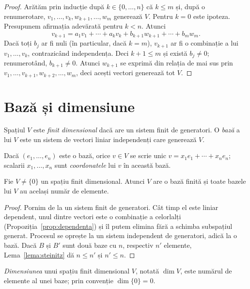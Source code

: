 \begin{proof}
Arătăm prin inducție după $k\in\{0,\dots,n\}$ că $k\le m$ și, după o renumerotare, $v_1,\dots,v_k,w_{k+1},\dots,w_m$ generează $V$. Pentru $k=0$ este ipoteza. Presupunem afirmația adevărată pentru $k<n$. Atunci
\[
v_{k+1}=a_1v_1+\cdots+a_kv_k+b_{k+1}w_{k+1}+\cdots+b_mw_m .
\]
Dacă toți $b_j$ ar fi nuli (în particular, dacă $k=m$), $v_{k+1}$ ar fi o combinație a lui $v_1,\dots,v_k$, contrazicând independența. Deci $k+1\le m$ și există $b_j\neq0$; renumerotând, $b_{k+1}\neq0$. Atunci $w_{k+1}$ se exprimă din relația de mai sus prin $v_1,\dots,v_{k+1},w_{k+2},\dots,w_m$, deci acești vectori generează tot $V$.
\end{proof}

\section{Bază și dimensiune}

\begin{definitie}
Spațiul $V$ este \emph{finit dimensional} dacă are un sistem finit de generatori. O \emph{bază} a lui $V$ este un sistem de vectori liniar independenți care generează $V$.
\end{definitie}

Dacă $(e_1,\dots,e_n)$ este o bază, orice $v\in V$ se scrie unic $v=x_1e_1+\cdots+x_ne_n$; scalarii $x_1,\dots,x_n$ sunt \emph{coordonatele} lui $v$ în această bază.

\begin{teorema}\label{teo:baza}
Fie $V\neq\{0\}$ un spațiu finit dimensional. Atunci $V$ are o bază finită și toate bazele lui $V$ au același număr de elemente.
\end{teorema}

\begin{proof}
Pornim de la un sistem finit de generatori. Cât timp el este liniar dependent, unul dintre vectori este o combinație a celorlalți (Propoziția~\ref{prop:dependenta}) și îl putem elimina fără a schimba subspațiul generat. Procesul se oprește la un sistem independent de generatori, adică la o bază. Dacă $B$ și $B'$ sunt două baze cu $n$, respectiv $n'$ elemente, Lema~\ref{lema:steinitz} dă $n\le n'$ și $n'\le n$.
\end{proof}

\begin{definitie}
\emph{Dimensiunea} unui spațiu finit dimensional $V$, notată $\dim V$, este numărul de elemente al unei baze; prin convenție $\dim\{0\}=0$.
\end{definitie}

